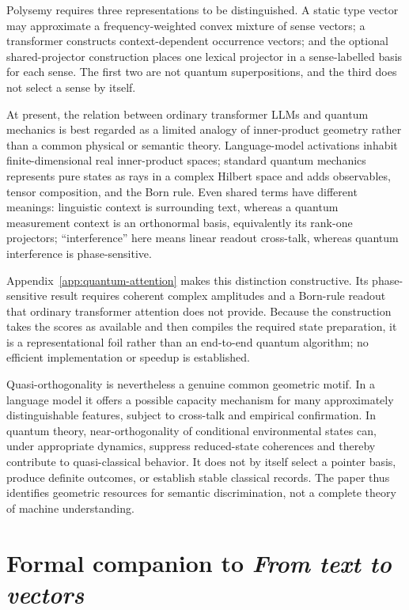 \documentclass[
  aps,
  reprint,
  superscriptaddress,
  floatfix,
  nofootinbib,
  longbibliography
]{revtex4-2}
\begin{document}
Polysemy requires three representations to be distinguished.  A static type
vector may approximate a frequency-weighted convex mixture of sense vectors;
a transformer constructs context-dependent occurrence vectors; and the
optional shared-projector construction places one lexical projector in a
sense-labelled basis for each sense.  The first two are not quantum
superpositions, and the third does not select a sense by itself.

At present, the relation between ordinary transformer LLMs and quantum mechanics
is best regarded as a limited analogy of inner-product geometry rather than a
common physical or semantic theory.  Language-model activations inhabit
finite-dimensional real inner-product spaces; standard quantum mechanics
represents pure states as rays in a complex Hilbert space and adds observables,
tensor composition, and the Born rule.  Even shared terms have different
meanings: linguistic context is surrounding text, whereas a quantum
measurement context is an orthonormal basis, equivalently its rank-one
projectors; ``interference''
here means linear readout cross-talk, whereas quantum interference is
phase-sensitive.

Appendix~\ref{app:quantum-attention} makes this distinction constructive.  Its
phase-sensitive result requires coherent complex amplitudes and a Born-rule
readout that ordinary transformer attention does not provide.  Because the
construction takes the scores as available and then compiles the required
state preparation, it is a representational foil rather than an end-to-end
quantum algorithm; no efficient implementation or speedup is established.

Quasi-orthogonality is nevertheless a genuine common geometric motif.  In a
language model it offers a possible capacity mechanism for many approximately
distinguishable features, subject to cross-talk and empirical confirmation.
In quantum theory, near-orthogonality of conditional environmental states can,
under appropriate dynamics, suppress reduced-state coherences and thereby
contribute to quasi-classical behavior.  It does not by itself select a pointer
basis, produce definite outcomes, or establish stable classical records.  The
paper thus identifies geometric resources for semantic discrimination, not a
complete theory of machine understanding.

\appendix

\section{Formal companion to \emph{From text to vectors}}
\label{app:vectors}
\end{document}
